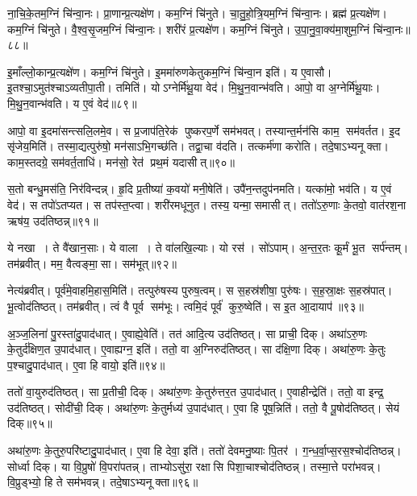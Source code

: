 ना॒चि॒के॒तम॒ग्निं चि॑न्वा॒नः। 
प्रा॒णान्प्र॒त्यक्षे॑ण। कम॒ग्निं चि॑नुते। चा॒तु॒\ar{}हो॒त्रि॒य\-म॒ग्निं चि॑न्वा॒नः। 
ब्रह्म॑ प्र॒त्यक्षे॑ण। कम॒ग्निं चि॑नुते। वै॒श्व॒सृ॒जम॒ग्निं चि॑न्वा॒नः। 
शरी॑रं प्र॒त्यक्षे॑ण। कम॒ग्निं चि॑नुते। उ॒पा॒नु॒वा॒क्य॑\-मा॒शुम॒ग्निं चि॑न्वा॒नः॥८८॥


इ॒माँल्लो॒कान्प्र॒त्यक्षे॑ण। कम॒ग्निं चि॑नुते। 
इ॒ममा॑रुणकेतुकम॒ग्निं चि॑न्वा॒न इति॑। य ए॒वासौ। 
इ॒तश्चा॒ऽमुत॑श्चाऽव्यतीपा॒ती। तमिति॑। 
योऽग्नेर्मि॑थू॒या वेद॑। मि॒थु॒न॒वान्भ॑वति। 
आपो॒ वा अ॒ग्नेर्मि॑थू॒याः। मि॒थु॒न॒वान्भ॑वति। य ए॒वं वेद॑॥८९॥\anuvakamend


आपो॒ वा इ॒दमा॑सन्त्सलि॒लमे॒व। स प्र॒जाप॑ति॒रेक॑ पुष्करप॒र्णे सम॑भवत्‌। 
तस्यान्त॒र्मन॑सि काम॒ सम॑वर्तत। इ॒द सृ॑जेय॒मिति॑। 
तस्मा॒द्यत्पुरु॑षो॒ मन॑साऽभि॒गच्छ॑ति। तद्वा॒चा व॑दति। 
तत्कर्म॑णा करोति। तदे॒षाऽभ्यनूक्ता। 
काम॒स्तदग्रे॒ सम॑वर्त॒ताधि॑। मन॑सो॒ रेत॑ प्रथ॒मं यदासीत्‌॥९०॥


स॒तो बन्धु॒मस॑ति॒ निर॑विन्दन्न्‌। हृ॒दि प्र॒तीष्या॑ क॒वयो॑ मनी॒षेति॑। 
उपै॑न॒न्तदुप॑नमति। यत्का॑मो॒ भव॑ति। य ए॒वं वेद॑। 
स तपो॑ऽतप्यत। स तप॑स्त॒प्त्वा। शरी॑रमधूनुत। तस्य॒ यन्मा॒समासीत्‌। 
ततो॑ऽरु॒णाः के॒तवो॒ वात॑रश॒ना ऋष॑य॒ उद॑तिष्ठन्न्॥९१॥


ये नखा। ते वै॑खान॒साः। ये वाला। ते वा॑लखि॒ल्याः। 
यो रस॑। सो॑ऽपाम्‌। अ॒न्त॒र॒तः कू॒र्मं भू॒त सर्प॑न्तम्‌। 
तम॑ब्रवीत्‌। मम॒ वैत्वङ्मा॒सा। सम॑भूत्‌॥९२॥


नेत्य॑ब्रवीत्। पूर्व॑मे॒वाहमि॒हास॒मिति॑। 
तत्पुरु॑षस्य पुरुष॒त्वम्‌। स स॒हस्र॑शी\ur{}षा॒ पुरु॑षः। 
स॒ह॒स्रा॒क्षः स॒हस्र॑पात्‌। भू॒त्वोद॑तिष्ठत्‌। 
तम॑ब्रवीत्‌। त्वं वै पूर्व सम॑भूः। 
त्वमि॒दं पूर्व॑ कुरु॒ष्वेति॑। स इ॒त आ॒दायाप॑॥९३॥


अ॒ञ्ज॒लिना॑ पु॒रस्ता॑दु॒पाद॑धात्‌। ए॒वाह्ये॒वेति॑। 
तत॑ आदि॒त्य उद॑तिष्ठत्‌। सा प्राची॒ दिक्‌। 
अथा॑ऽरु॒णः के॒तुर्द॑क्षिण॒त उ॒पाद॑धात्‌। 
ए॒वाह्यग्न॒ इति॑। ततो॒ वा अ॒ग्निरुद॑तिष्ठत्‌। 
सा द॑क्षि॒णा दिक्‌। अथा॑रु॒णः के॒तुः प॒श्चादु॒पाद॑धात्‌। 
ए॒वा हि वायो॒ इति॑॥९४॥


ततो॑ वा॒युरुद॑तिष्ठत्। सा प्र॒तीची॒ दिक्‌। 
अथा॑रु॒णः के॒तुरु॑त्तर॒त उ॒पाद॑धात्‌। ए॒वाहीन्द्रेति॑। 
ततो॒ वा इन्द्र॒ उद॑तिष्ठत्‌। सोदी॑ची॒ दिक्‌। 
अथा॑रु॒णः के॒तुर्मध्य॑ उ॒पाद॑धात्‌। ए॒वा हि पूष॒न्निति॑। 
ततो॒ वै पू॒षोद॑तिष्ठत्‌। सेयं दिक्‌॥९५॥


अथा॑रु॒णः के॒तुरु॒परि॑ष्टादु॒पाद॑धात्‌। ए॒वा हि देवा॒ इति॑। 
ततो॑ देवमनु॒ष्याः पि॒तर॑। ग॒न्ध॒र्वा॒प्स॒रस॒श्चोद॑तिष्ठन्न्‌। 
सोर्ध्वा दिक्‌। या वि॒प्रुषो॑ वि॒परा॑पतन्न्‌। 
ताभ्योऽसु॑रा॒ रक्षासि पिशा॒चाश्चोद॑तिष्ठन्न्‌। तस्मा॒त्ते परा॑भवन्न्‌। 
वि॒प्रुड्भ्यो॒ हि ते सम॑भवन्न्‌। तदे॒षाऽभ्यनूक्ता॥९६॥


